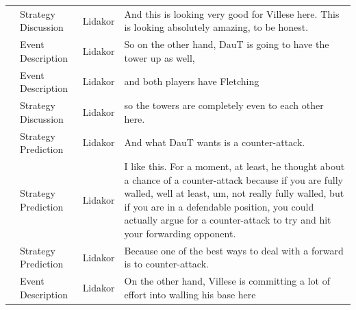 {\begin{longtable}{@{}>{\theAppRow}r|L{2.3cm}L{1.0cm}U{11.55cm}@{}}
    & Strategy Discussion   & Lidakor & And this is looking very good for Villese here. This is looking absolutely amazing, to be honest.                                                                                                                                                                                               \\
    & Event Description     & Lidakor & So on the other hand, DauT is going to have the tower up as well,                                                                                                                                                                                                                               \\
    & Event Description     & Lidakor & and both players have Fletching                                                                                                                                                                                                                                                                 \\
    & Strategy Discussion   & Lidakor & so the towers are completely even to each other here.                                                                                                                                                                                                                                           \\
    & Strategy Prediction   & Lidakor & And what DauT wants is a counter-attack.                                                                                                                                                                                                                                                        \\
    & Strategy Prediction   & Lidakor & I like this. For a moment, at least, he thought about a chance of a counter-attack because if you are fully walled, well at least, um, not really fully walled, but if you are in a defendable position, you could actually argue for a counter-attack to try and hit your forwarding opponent. \\
    & Strategy Prediction   & Lidakor & Because one of the best ways to deal with a forward is to counter-attack.                                                                                                                                                                                                                       \\
    & Event Description     & Lidakor & On the other hand, Villese is committing a lot of effort into walling his base here                                                                                                                                                                                                             \\

\end{longtable}}
